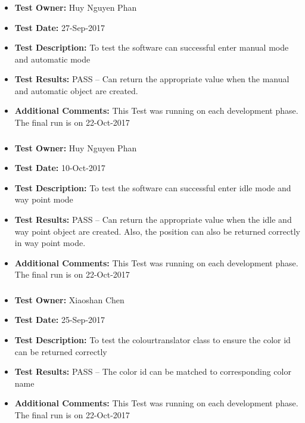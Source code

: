 \documentclass[10pt,a4paper,titlepage]{article}
\begin{document}
\subsubsection*{}
\begin{itemize}
\item \textbf{Test Owner:} Huy Nguyen Phan
\item \textbf{Test Date:} 27-Sep-2017
\item \textbf{Test Description:} To test the software can successful enter manual mode and automatic mode
\item \textbf{Test Results:} PASS – Can return the appropriate value when the manual and automatic object are created.
\item \textbf{Additional Comments:} This Test was running on each development phase. The final run is on 22-Oct-2017
\end{itemize}

\subsubsection*{}
\begin{itemize}
\item \textbf{Test Owner:} Huy Nguyen Phan
\item \textbf{Test Date:} 10-Oct-2017
\item \textbf{Test Description:} To test the software can successful enter idle mode and way point mode
\item \textbf{Test Results:} PASS – Can return the appropriate value when the idle and way point object are created. Also, the position can also be returned correctly in way point mode.
\item \textbf{Additional Comments:} This Test was running on each development phase. The final run is on 22-Oct-2017
\end{itemize}
\subsubsection*{}
\begin{itemize}
\item \textbf{Test Owner:} Xiaoshan Chen
\item \textbf{Test Date:} 25-Sep-2017
\item \textbf{Test Description:} To test the colourtranslator class to ensure the color id can be returned correctly
\item \textbf{Test Results:} PASS – The color id can be matched to corresponding color name
\item \textbf{Additional Comments:} This Test was running on each development phase. The final run is on 22-Oct-2017
\end{itemize}
\end{document}
